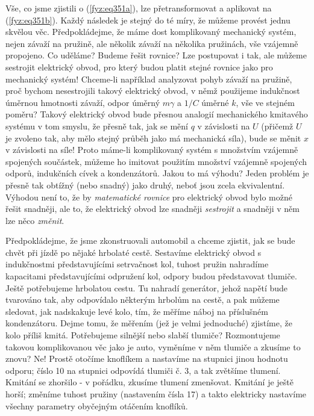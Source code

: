 {    Vše, co jsme zjistili o (\ref{fyz:eq351a}), lze přetransformovat a aplikovat na 
    (\ref{fyz:eq351b}). Každý následek je stejný do té míry, že můžeme provést jednu skvělou věc. 
    Předpokládejme, že máme dost komplikovaný mechanický systém, nejen závaží na pružině, ale 
    několik závaží na několika pružinách, vše vzájemně propojeno. Co uděláme? Budeme řešit rovnice? 
    Lze postupovat i tak, ale můžeme sestrojit elektrický obvod, pro který budou platit stejné 
    rovnice jako pro mechanický systém! Chceme-li například analyzovat pohyb závaží na pružině, 
    proč bychom nesestrojili takový elektrický obvod, v němž použijeme indukčnost úměrnou hmotnosti 
    závaží, odpor úměrný \(m\gamma\) a \(1/C\) úměrné \(k\), vše ve stejném poměru? Takový 
    elektrický obvod bude přesnou analogií mechanického kmitavého systému v tom smyslu, že přesně 
    tak, jak se mění \(q\) v závislosti na \(U\) (přičemž \(U\) je zvoleno tak, aby mělo stejný 
    průběh jako má mechanická síla), bude se měnit \(x\) v závislosti na síle! Proto máme-li 
    komplikovaný systém s množstvím vzájemně spojených součástek, můžeme ho imitovat použitím 
    množství vzájemně spojených odporů, indukčních cívek a kondenzátorů. Jakou to má výhodu? Jeden 
    problém je přesně tak obtížný (nebo snadný) jako druhý, neboť jsou zcela ekvivalentní. Výhodou 
    není to, že by \emph{matematické rovnice} pro elektrický obvod bylo možné řešit snadněji, ale 
    to, že elektrický obvod lze snadněji \emph{sestrojit} a snadněji v něm lze něco \emph{změnit}.
    
    Předpokládejme, že jsme zkonstruovali automobil a chceme zjistit, jak se bude chvět při jízdě 
    po nějaké hrbolaté cestě. Sestavíme elektrický obvod s indukčnostmi představujícími setrvačnost 
    kol, tuhost pružin nahradíme kapacitami představujícími odpružení kol, odpory budou 
    představovat tlumiče. Ještě potřebujeme hrbolatou cestu. Tu nahradí generátor, jehož napětí 
    bude tvarováno tak, aby odpovídalo některým hrbolům na cestě, a pak můžeme sledovat, jak 
    nadskakuje levé kolo, tím, že měříme náboj na příslušném kondenzátoru. Dejme tomu, že měřením 
    (jež je velmi jednoduché) zjistíme, že kolo příliš kmitá. Potřebujeme silnější nebo slabší 
    tlumiče? Rozmontujeme takovou komplikovanou věc jako je auto, vyměníme v něm tlumiče a zkusíme 
    to znovu? Ne! Prostě otočíme knoflíkem a nastavíme na stupnici jinou hodnotu odporu; číslo 10 
    na stupnici odpovídá tlumiči č. 3, a tak zvětšíme tlumení. Kmitání se zhoršilo - v pořádku, 
    zkusíme tlumení zmenšovat. Kmitání je ještě horší; změníme tuhost pružiny (nastavením čísla 17) 
    a takto elektricky nastavíme všechny parametry obyčejným otáčením knoflíků. 
    
}
